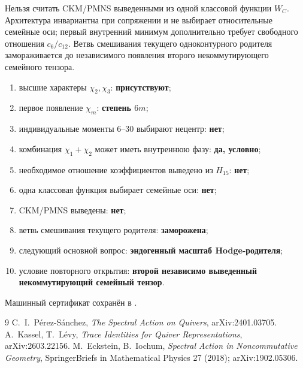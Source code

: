 \begin{nogocriterion}
Нельзя считать CKM/PMNS выведенными из одной классовой функции $W_C$.
Архитектура инвариантна при сопряжении и не выбирает относительные семейные
оси; первый внутренний минимум дополнительно требует свободного отношения
$c_6/c_{12}$. Ветвь смешивания текущего одноконтурного родителя замораживается
до независимого появления второго некоммутирующего семейного тензора.
\end{nogocriterion}

\begin{protocol}
\begin{enumerate}
 \item высшие характеры $\chi_2,\chi_3$: \textbf{присутствуют};
 \item первое появление $\chi_m$: \textbf{степень $6m$};
 \item индивидуальные моменты $6$--$30$ выбирают нецентр: \textbf{нет};
 \item комбинация $\chi_1+\chi_2$ может иметь внутреннюю фазу:
 \textbf{да, условно};
 \item необходимое отношение коэффициентов выведено из $H_{15}$:
 \textbf{нет};
 \item одна классовая функция выбирает семейные оси: \textbf{нет};
 \item CKM/PMNS выведены: \textbf{нет};
 \item ветвь смешивания текущего родителя: \textbf{заморожена};
 \item следующий основной вопрос: \textbf{эндогенный масштаб Hodge-родителя};
 \item условие повторного открытия: \textbf{второй независимо выведенный
 некоммутирующий семейный тензор}.
\end{enumerate}
\end{protocol}

Машинный сертификат сохранён в
.

\begin{thebibliography}{9}
C.~I.~P\'erez-S\'anchez,
\emph{The Spectral Action on Quivers}, arXiv:2401.03705.
A.~Kassel, T.~L\'evy,
\emph{Trace Identities for Quiver Representations}, arXiv:2603.22156.
M.~Eckstein, B.~Iochum,
\emph{Spectral Action in Noncommutative Geometry},
SpringerBriefs in Mathematical Physics 27 (2018); arXiv:1902.05306.
\end{thebibliography}